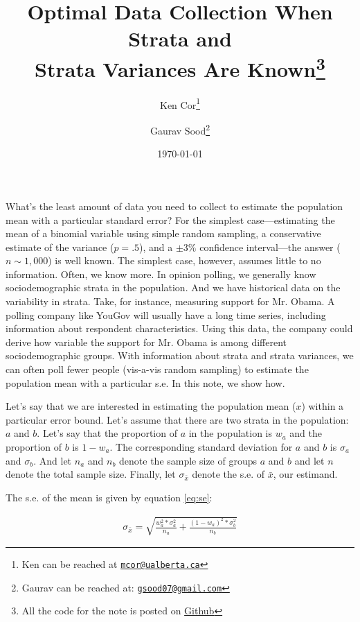\documentclass[12pt, letterpaper]{article}
\title{\Large{Optimal Data Collection When Strata and\\ Strata Variances Are Known}\footnote{All the code for the note is posted on \href{https://github.com/soodoku/optimal\_data\_collection/scripts/smallest\_n\_for\_se.R}{Github}}}
\author{Ken Cor\thanks{Ken can be reached at \href{mailto:mcor@ualberta.ca}{\footnotesize{\texttt{mcor@ualberta.ca}}}} \and Gaurav Sood\thanks{Gaurav can be reached at: \href{mailto:gsood07@gmail.com}{\footnotesize{\texttt{gsood07@gmail.com}}}}\vspace{.5cm}}
\date{\vspace{.5cm}\normalsize{\today}}
\begin{document}
\maketitle

\begin{comment}

setwd(paste0(githubdir, "optimal_data_collection/ms/"))
tools::texi2dvi("optimal_data_collection.tex", pdf = TRUE, clean = TRUE) 
setwd(githubdir)

\end{comment}

\doublespacing
What's the least amount of data you need to collect to estimate the population mean with a particular standard error? For the simplest case---estimating the mean of a binomial variable using simple random sampling, a conservative estimate of the variance ($p = .5$), and a $\pm3\%$ confidence interval---the answer ($n \sim 1,000$) is well known. The simplest case, however, assumes little to no information. Often, we know more. In opinion polling, we generally know sociodemographic strata in the population. And we have historical data on the variability in strata. Take, for instance, measuring support for Mr. Obama. A polling company like YouGov will usually have a long time series, including information about respondent characteristics. Using this data, the company could derive how variable the support for Mr. Obama is among different sociodemographic groups. With information about strata and strata variances, we can often poll fewer people (vis-a-vis random sampling) to estimate the population mean with a particular s.e. In this note, we show how.

Let's say that we are interested in estimating the population mean ($x$) within a particular error bound. Let's assume that there are two strata in the population: $a$ and $b$. Let's say that the proportion of $a$ in the population is $w_a$ and the proportion of $b$ is $1 - w_a$. The corresponding standard deviation for $a$ and $b$ is $\sigma_a$ and $\sigma_b$. And let $n_a$ and $n_b$ denote the sample size of groups $a$ and $b$ and let $n$ denote the total sample size. Finally, let $\sigma_{\bar{x}}$ denote the s.e. of $\bar{x}$, our estimand. 

The s.e. of the mean is given by equation \ref{eq:se}:

\begin{align}\label{eq:se}
\sigma_{\bar{x}} = \sqrt{\frac{w_a^2*\sigma_a^2}{n_a} + \frac{(1 - w_a)^2*\sigma_b^2}{n_b}}
\end{align}
\end{document}
